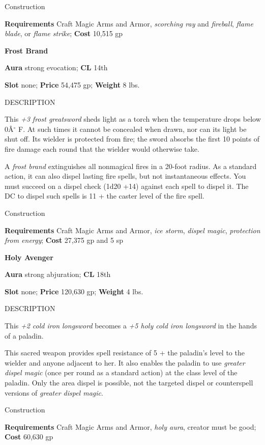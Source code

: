 Construction
				
\textbf{Requirements} Craft Magic Arms and Armor, \textit{scorching ray }and \textit{fireball}, \textit{flame blade}, or \textit{flame strike}; \textbf{Cost }10,515 gp
				
\textbf{Frost Brand}
				
\textbf{Aura} strong evocation; \textbf{CL} 14th
				
\textbf{Slot} none; \textbf{Price} 54,475 gp; \textbf{Weight} 8 lbs.
				
DESCRIPTION
				
This \textit{+3 frost greatsword} sheds light as a torch when the temperature drops below 0\^A\mbox{${}^\circ$} F. At such times it cannot be concealed when drawn, nor can its light be shut off. Its wielder is protected from fire; the sword absorbs the first 10 points of fire damage each round that the wielder would otherwise take.
				
A \textit{frost brand} extinguishes all nonmagical fires in a 20-foot radius. As a standard action, it can also dispel lasting fire spells, but not instantaneous effects. You must succeed on a dispel check (1d20 +14) against each spell to dispel it. The DC to dispel such spells is 11 + the caster level of the fire spell. 
				
Construction
				
\textbf{Requirements} Craft Magic Arms and Armor, \textit{ice storm}, \textit{dispel magic}, \textit{protection from energy}; \textbf{Cost }27,375 gp and 5 sp
				
\textbf{Holy Avenger}
				
\textbf{Aura} strong abjuration; \textbf{CL} 18th
				
\textbf{Slot} none; \textbf{Price} 120,630 gp; \textbf{Weight} 4 lbs.
				
DESCRIPTION
				
This \textit{+2 cold iron longsword} becomes a \textit{+5 holy cold iron longsword} in the hands of a paladin.
				
This sacred weapon provides spell resistance of 5 + the paladin's level to the wielder and anyone adjacent to her. It also enables the paladin to use \textit{greater dispel magic} (once per round as a standard action) at the class level of the paladin. Only the area dispel is possible, not the targeted dispel or counterspell versions of \textit{greater dispel magic}.
				
Construction
				
\textbf{Requirements} Craft Magic Arms and Armor, \textit{holy aura}, creator must be good; \textbf{Cost }60,630 gp
				
